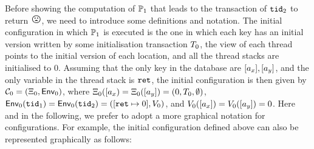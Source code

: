 \documentclass[a4paper,UKenglish]{article}%
\theoremstyle{plain}
\begin{document}
Before showing the computation of $\mathbb{P}_1$ that leads to the transaction of 
$\mathtt{tid}_2$ to return ${\Large \frownie{}}$, we need to introduce some 
definitions and  notation.
The initial configuration in which $\mathbb{P}_1$ is executed is the one in which 
each key has an initial version written by some initialisation transaction $T_0$, 
the view of each thread points to the initial version of each location, and all the  
thread stacks are initialised to $0$. Assuming that the only key in the database 
are $[a_x], [a_y]$, and the only variable in the thread stack is $\texttt{ret}$, 
the initial configuration is then given by $\mathcal{C}_0 = (\Xi_{0}, \mathsf{Env}_0)$, 
where $\Xi_{0}([a_{x}) = \Xi_{0}([a_y]) =  (0, T_0, \emptyset)$,  
$\mathsf{Env}_0(\mathtt{tid}_1) = \mathsf{Env}_0(\mathtt{tid}_2) = ([\texttt{ret} \mapsto 0], V_0)$, 
and $V_0([a_{x}]) = V_0([a_{y}]) = 0$. Here and in the following, we prefer 
to adopt a more graphical notation for configurations. For example, the initial configuration 
defined above can also be represented graphically as follows: 
\end{document}
